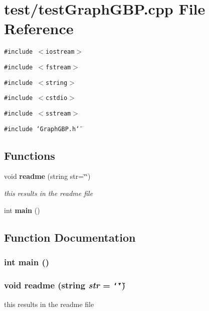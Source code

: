 \section{test/testGraphGBP.cpp File Reference}
\label{testGraphGBP_8cpp}
{\tt \#include $<$iostream$>$}\par
{\tt \#include $<$fstream$>$}\par
{\tt \#include $<$string$>$}\par
{\tt \#include $<$cstdio$>$}\par
{\tt \#include $<$sstream$>$}\par
{\tt \#include \char`\"{}GraphGBP.h\char`\"{}}\par
\subsection*{Functions}
\begin{CompactItemize}
\item 
void {\bf readme} (string str=\char`\"{}\char`\"{})
\begin{CompactList}\small\item\em this results in the readme file \item\end{CompactList}\item 
int {\bf main} ()
\end{CompactItemize}


\subsection{Function Documentation}
\subsubsection{\setlength{\rightskip}{0pt plus 5cm}int main ()}\label{testGraphGBP_8cpp_446c6b9a1a4dbab517fbb760870458a3}


\subsubsection{\setlength{\rightskip}{0pt plus 5cm}void readme (string {\em str} = {\tt \char`\"{}\char`\"{}})}\label{testGraphGBP_8cpp_6ac3748b150cbbcf9e4bc47863f33b74}


this results in the readme file 


